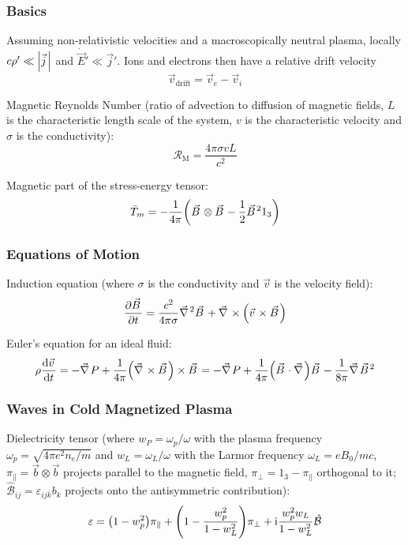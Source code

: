 		\subsubsection{Basics}
			Assuming non-relativistic velocities and a macroscopically neutral plasma, \ie locally $c\rho' \ll \abs{\vec{j}}$ and $\dot{\vec{E}}' \ll \vec{j}'$.
			Ions and electrons then have a relative drift velocity
			\begin{equation}
				\vec{v}_{\text{drift}} = \vec{v}_e - \vec{v}_i
			\end{equation}

			\noindent
			Magnetic Reynolds Number (ratio of advection to diffusion of magnetic fields, $L$ is the characteristic length scale of the system, $v$ is the characteristic velocity and $\sigma$ is the conductivity):
			\begin{equation}
				\mathcal{R}_\text{M} = \frac{4\pi\sigma v L}{c^2}
			\end{equation}

			\noindent
			Magnetic part of the stress-energy tensor:
			\begin{equation}
				\bar{T}_m = -\frac{1}{4\pi} \qty(\vec{B} \otimes \vec{B} - \frac{1}{2}\vec{B}^2 1_3)
			\end{equation}

		\subsubsection{Equations of Motion}
			Induction equation (where $\sigma$ is the conductivity and $\vec{v}$ is the velocity field):
			\begin{equation}
				\pdv{\vec{B}}{t} = \frac{c^2}{4\pi\sigma} \Nabla^2 \vec{B} + \Nabla\times\qty(\vec{v}\times\vec{B})
			\end{equation}

			\noindent
			Euler's equation for an ideal fluid:
			\begin{equation}
				\rho \dv{\vec{v}}{t} = - \Nabla P + \frac{1}{4\pi}\qty(\Nabla\times\vec{B})\times\vec{B}
				= - \Nabla P + \frac{1}{4\pi} \qty(\vec{B} \cdot \Nabla) \vec{B} - \frac{1}{8\pi} \Nabla \vec{B}^2
			\end{equation}

		\subsubsection{Waves in Cold Magnetized Plasma}
			Dielectricity tensor (where $w_P = \omega_p / \omega$ with the plasma frequency $\omega_p = \sqrt{4\pi e^2 n_e/m}$ and $w_L = \omega_L / \omega$ with the Larmor frequency $\omega_L = e B_0/mc$, $\pi_\parallel = \vec{b}\otimes\vec{b}$ projects parallel to the magnetic field, $\pi_\perp = 1_3 - \pi_\parallel$ orthogonal to it; $\hat{\mathcal{B}}_{ij} = \varepsilon_{ijk} b_k$ projects onto the antisymmetric contribution):
			\begin{equation}
				\varepsilon = \qty(1 - w_p^2) \pi_\parallel + \qty(1-\frac{w_p^2}{1-w_L^2})\pi_\perp + \mathrm{i} \frac{w_p^2 w_L}{1-w_L^2} \hat{\mathcal{B}}
			\end{equation}

